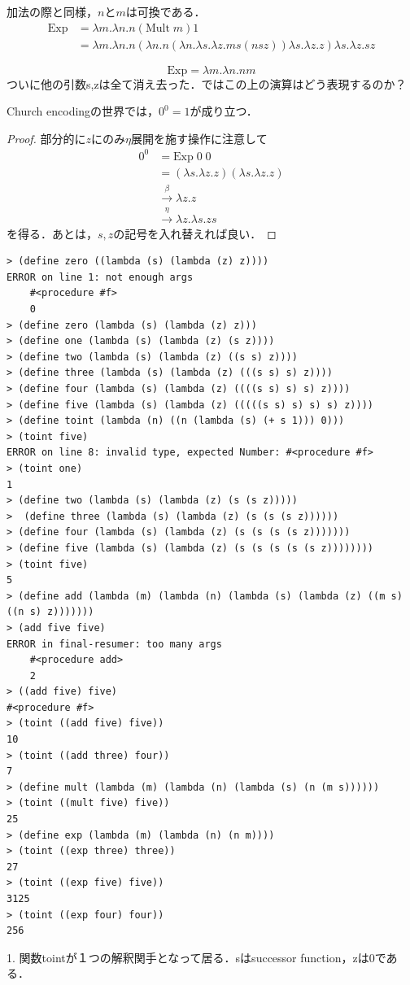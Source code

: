 \documentclass[uplatex, dvipdfmx]{jsreport}
\begin{document}
\begin{definition}[冪乗]
    加法の際と同様，$n$と$m$は可換である．
    \begin{align*}
        \mathrm{Exp} &= \lambda m.\lambda n.n(\mathrm{Mult}\; m) 1\\
        &= \lambda m.\lambda n.n(\lambda n.n(\lambda n.\lambda s.\lambda z.ms(nsz)) \lambda s.\lambda z.z) \lambda s.\lambda z.sz
    \end{align*}
\end{definition}
\begin{theorem}\label{prop-lambda-exp}
    \[ \mathrm{Exp} = \lambda m.\lambda n.nm \]
    ついに他の引数s,zは全て消え去った．ではこの上の演算はどう表現するのか？
\end{theorem}
\begin{proposition}
    Church encodingの世界では，$0^0=1$が成り立つ．
\end{proposition}
\begin{proof}
    部分的に$z$にのみ$\eta$展開を施す操作に注意して
    \begin{align*}
        0^0 &= \mathrm{Exp}\;0\;0\\
        &= (\lambda s.\lambda z.z)(\lambda s.\lambda z.z)\\
        &\xrightarrow{\beta} \lambda z.z\\
        &\xrightarrow{\eta} \lambda z.\lambda s.zs
    \end{align*}
    を得る．あとは，$s,z$の記号を入れ替えれば良い．
\end{proof}

\begin{example}[Scheme]

\begin{lstlisting}
> (define zero ((lambda (s) (lambda (z) z))))
ERROR on line 1: not enough args
    #<procedure #f>
    0
> (define zero (lambda (s) (lambda (z) z)))
> (define one (lambda (s) (lambda (z) (s z))))
> (define two (lambda (s) (lambda (z) ((s s) z))))
> (define three (lambda (s) (lambda (z) (((s s) s) z))))
> (define four (lambda (s) (lambda (z) ((((s s) s) s) z))))
> (define five (lambda (s) (lambda (z) (((((s s) s) s) s) z))))
> (define toint (lambda (n) ((n (lambda (s) (+ s 1))) 0)))
> (toint five)
ERROR on line 8: invalid type, expected Number: #<procedure #f>
> (toint one)
1
> (define two (lambda (s) (lambda (z) (s (s z)))))
>  (define three (lambda (s) (lambda (z) (s (s (s z))))))
> (define four (lambda (s) (lambda (z) (s (s (s (s z)))))))
> (define five (lambda (s) (lambda (z) (s (s (s (s (s z))))))))
> (toint five)
5
> (define add (lambda (m) (lambda (n) (lambda (s) (lambda (z) ((m s) ((n s) z)))))))
> (add five five)
ERROR in final-resumer: too many args
    #<procedure add>
    2
> ((add five) five)
#<procedure #f>
> (toint ((add five) five))
10
> (toint ((add three) four))
7
> (define mult (lambda (m) (lambda (n) (lambda (s) (n (m s))))))
> (toint ((mult five) five))
25
> (define exp (lambda (m) (lambda (n) (n m))))
> (toint ((exp three) three))
27
> (toint ((exp five) five))
3125
> (toint ((exp four) four))
256
\end{lstlisting}
    1. 関数tointが１つの解釈関手となって居る．sはsuccessor function，zは0である．
\end{example}
\end{document}

